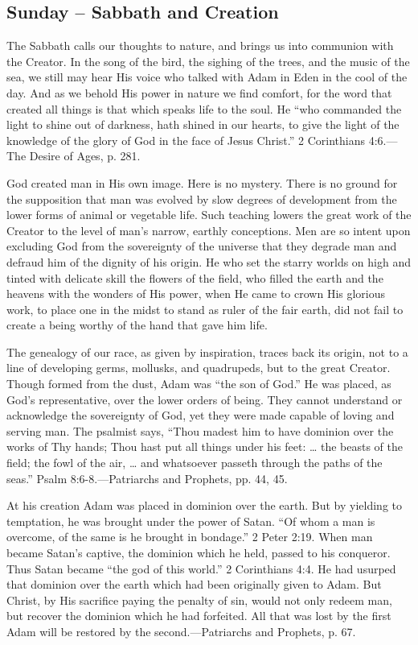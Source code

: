 \documentclass[a4paper, 10pt, twoside, headings=small]{scrartcl}
\begin{document}
\begin{multicols}{2}
\section*{Sunday – Sabbath and Creation}

The Sabbath calls our thoughts to nature, and brings us into communion with the Creator. In the song of the bird, the sighing of the trees, and the music of the sea, we still may hear His voice who talked with Adam in Eden in the cool of the day. And as we behold His power in nature we find comfort, for the word that created all things is that which speaks life to the soul. He “who commanded the light to shine out of darkness, hath shined in our hearts, to give the light of the knowledge of the glory of God in the face of Jesus Christ.” 2 Corinthians 4:6.—The Desire of Ages, p. 281.

God created man in His own image. Here is no mystery. There is no ground for the supposition that man was evolved by slow degrees of development from the lower forms of animal or vegetable life. Such teaching lowers the great work of the Creator to the level of man’s narrow, earthly conceptions. Men are so intent upon excluding God from the sovereignty of the universe that they degrade man and defraud him of the dignity of his origin. He who set the starry worlds on high and tinted with delicate skill the flowers of the field, who filled the earth and the heavens with the wonders of His power, when He came to crown His glorious work, to place one in the midst to stand as ruler of the fair earth, did not fail to create a being worthy of the hand that gave him life.

The genealogy of our race, as given by inspiration, traces back its origin, not to a line of developing germs, mollusks, and quadrupeds, but to the great Creator. Though formed from the dust, Adam was “the son of God.” He was placed, as God’s representative, over the lower orders of being. They cannot understand or acknowledge the sovereignty of God, yet they were made capable of loving and serving man. The psalmist says, “Thou madest him to have dominion over the works of Thy hands; Thou hast put all things under his feet: … the beasts of the field; the fowl of the air, … and whatsoever passeth through the paths of the seas.” Psalm 8:6-8.—Patriarchs and Prophets, pp. 44, 45.

At his creation Adam was placed in dominion over the earth. But by yielding to temptation, he was brought under the power of Satan. “Of whom a man is overcome, of the same is he brought in bondage.” 2 Peter 2:19. When man became Satan’s captive, the dominion which he held, passed to his conqueror. Thus Satan became “the god of this world.” 2 Corinthians 4:4. He had usurped that dominion over the earth which had been originally given to Adam. But Christ, by His sacrifice paying the penalty of sin, would not only redeem man, but recover the dominion which he had forfeited. All that was lost by the first Adam will be restored by the second.—Patriarchs and Prophets, p. 67.


\end{multicols}
\end{document}
